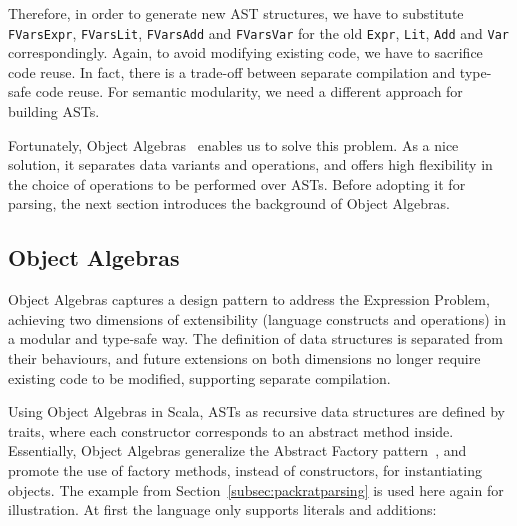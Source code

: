 Therefore, in order to generate new AST structures, we have to substitute \lstinline{FVarsExpr}, \lstinline{FVarsLit}, \lstinline{FVarsAdd} and \lstinline{FVarsVar} for the old \lstinline{Expr}, \lstinline{Lit}, \lstinline{Add} and \lstinline{Var} correspondingly. Again, to avoid modifying existing code, we have to sacrifice code reuse. In fact, there is a trade-off between separate compilation and type-safe code reuse. For semantic modularity, we need a different approach for building ASTs.


Fortunately, Object Algebras~\cite{Oliveira:2012} enables us to solve this problem. As a nice solution, it separates data variants
and operations, and offers high flexibility in the choice of operations to be performed over ASTs. Before adopting it for parsing, the next section introduces the background of Object Algebras.

\subsection{Object Algebras}\label{subsec:objectalgebras}
Object Algebras captures a design pattern to address the Expression Problem, achieving two dimensions of extensibility (language constructs and operations) in a modular and type-safe way. The definition of data structures is separated from their behaviours, and future extensions on both dimensions no longer require existing code to be modified, supporting separate compilation.

Using Object Algebras in Scala, ASTs as recursive data structures are defined by traits, where each constructor corresponds to an abstract method inside.
Essentially, Object Algebras generalize the {\sc Abstract Factory} pattern~\cite{gamma1995design}, and promote the use of factory methods, instead of constructors, for instantiating objects. The example from Section~\ref{subsec:packratparsing} is used here again for illustration.
At first the language only supports literals and additions:

